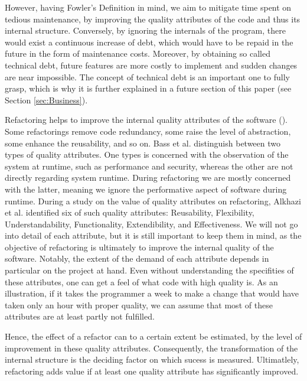 However, having Fowler's Definition in mind, 
	we aim to mitigate time spent on tedious maintenance, 
	by improving the quality attributes of the code and thus its internal structure.
Conversely, by ignoring the internals of the program, 
	there would exist a continuous increase of debt, 
	which would have to be repaid in the future in the form of maintenance costs.
Moreover, by obtaining so called technical debt, 
	future features are more costly to implement and sudden changes are near impossible. 
The concept of technical debt is an important one to fully grasp, 
	which is why it is further explained in a future section of this paper 
(see Section \ref{sec:Business}).
	

Refactoring helps to improve the internal quality attributes of the software (\cite[p.~129]{mens2004}). 
Some refactorings remove code redundancy, 
	some raise the level of abstraction, 
	some enhance the reusability, and so on.
Bass et al. \textcite{bass1998} distinguish 
	between two types of quality attributes. 
One types is concerned with the observation of the system at runtime, 
	such as performance and security, 
	whereas the other are not directly regarding system runtime.
During refactoring we are mostly concerned with the latter, 
	meaning we ignore the performative aspect of software during runtime.
During a study on the value of quality attributes on refactoring, 
	Alkhazi et al. \textcite[p.~4]{alkhazi2020} identified 
	six of such quality attributes: 
	Reusability, Flexibility, Understandability, 
	Functionality, Extendibility, and Effectiveness.
We will not go into detail of each attribute, 
	but it is still important to keep them in mind,
	as the objective of refactoring is  
	ultimately to improve the internal quality of the software.
Notably, the extent of the demand of each attribute 
	depends in particular on the project at hand.
Even without understanding the specifities of these attributes,
	one can get a feel of what code with high quality is.
As an illustration, 
	if it takes the programmer a week to make a change 
	that would have taken only an hour with proper quality, 
	we can assume that most of these attributes are at 
	least partly not fulfilled.

Hence, the effect of a refactor can to a certain extent be estimated, 
	by the level of improvement in these quality attributes.
Consequently, the transformation of the internal structure 
	is the deciding factor on which sucess is measured.
Ultimatlely, refactoring adds value if at least one quality attribute has significantly improved.

